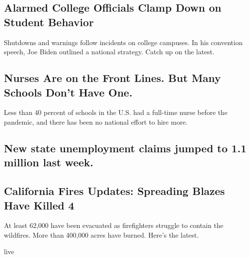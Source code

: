 \href{/2020/08/20/world/coronavirus-covid.html}{}

\hypertarget{alarmed-college-officials-clamp-down-on-student-behavior}{%
\subsection{Alarmed College Officials Clamp Down on Student
Behavior}\label{alarmed-college-officials-clamp-down-on-student-behavior}}

Shutdowns and warnings follow incidents on college campuses. In his
convention speech, Joe Biden outlined a national strategy. Catch up on
the latest.

\href{/2020/08/20/us/schools-reopening-nurses-covid.html}{}

\hypertarget{nurses-are-on-the-front-lines-but-many-schools-dont-have-one}{%
\subsection{Nurses Are on the Front Lines. But Many Schools Don't Have
One.}\label{nurses-are-on-the-front-lines-but-many-schools-dont-have-one}}

Less than 40 percent of schools in the U.S. had a full-time nurse before
the pandemic, and there has been no national effort to hire more.

\href{/2020/08/20/business/economy/unemployment-claims.html}{}

\hypertarget{new-state-unemployment-claims-jumped-to-11-million-last-week}{%
\subsection{New state unemployment claims jumped to 1.1 million last
week.}\label{new-state-unemployment-claims-jumped-to-11-million-last-week}}

\href{/2020/08/20/us/ca-fires.html}{}

\hypertarget{california-fires-updates-spreading-blazes-have-killed-4}{%
\subsection{California Fires Updates: Spreading Blazes Have Killed
4}\label{california-fires-updates-spreading-blazes-have-killed-4}}

At least 62,000 have been evacuated as firefighters struggle to contain
the wildfires. More than 400,000 acres have burned. Here's the latest.

live

